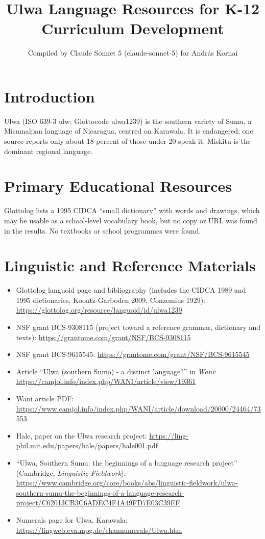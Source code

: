 \documentclass[12pt]{article}
\title{Ulwa Language Resources for K-12 Curriculum Development}
\author{Compiled by Claude Sonnet 5 (claude-sonnet-5) for Andr\'as Kornai}
\date{}
\begin{document}
\maketitle

\section{Introduction}
Ulwa (ISO 639-3 ulw; Glottocode ulwa1239) is the southern variety of Sumu, a Misumalpan language of Nicaragua, centred on Karawala. It is endangered; one source reports only about 18 percent of those under 20 speak it. Miskitu is the dominant regional language.

\section{Primary Educational Resources}
Glottolog lists a 1995 CIDCA ``small dictionary'' with words and drawings, which may be usable as a school-level vocabulary book, but no copy or URL was found in the results. No textbooks or school programmes were found.

\section{Linguistic and Reference Materials}
\begin{itemize}
\item Glottolog languoid page and bibliography (includes the CIDCA 1989 and 1995 dictionaries, Koontz-Garboden 2009, Conzemius 1929): \url{https://glottolog.org/resource/languoid/id/ulwa1239}
\item NSF grant BCS-9308115 (project toward a reference grammar, dictionary and texts): \url{https://grantome.com/grant/NSF/BCS-9308115}
\item NSF grant BCS-9615545: \url{https://grantome.com/grant/NSF/BCS-9615545}
\item Article ``Ulwa (southern Sumo) - a distinct language?'' in \emph{Wani}: \url{https://camjol.info/index.php/WANI/article/view/19361}
\item Wani article PDF: \url{https://www.camjol.info/index.php/WANI/article/download/20000/24464/73553}
\item Hale, paper on the Ulwa research project: \url{https://ling-phil.mit.edu/papers/hale/papers/hale001.pdf}
\item ``Ulwa, Southern Sumu: the beginnings of a language research project'' (Cambridge, \emph{Linguistic Fieldwork}): \url{https://www.cambridge.org/core/books/abs/linguistic-fieldwork/ulwa-southern-sumu-the-beginnings-of-a-language-research-project/C62013CB3C6ADEC4F4A49FD7E03C39EF}
\item Numerals page for Ulwa, Karawala: \url{https://lingweb.eva.mpg.de/channumerals/Ulwa.htm}
\end{itemize}
\end{document}
